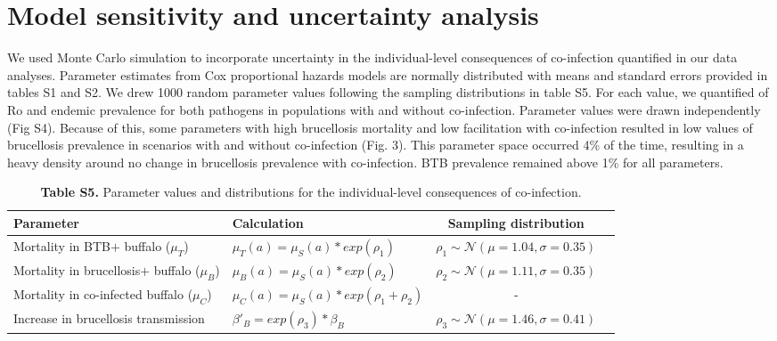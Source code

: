 \documentclass[10pt,letterpaper]{article}
\begin{document}
\section*{Model sensitivity and uncertainty analysis }
We used Monte Carlo simulation to incorporate uncertainty in the individual-level consequences of co-infection quantified in our data analyses. %
Parameter estimates from Cox proportional hazards models are normally distributed with means and standard errors provided in tables S1 and S2. We drew 1000 random parameter values following the sampling distributions in table S5.
For each value, we quantified of Ro and endemic prevalence for both pathogens in populations with and without co-infection.  
Parameter values were drawn independently (Fig S4).
Because of this, some parameters with high brucellosis mortality and low facilitation with co-infection resulted in low values of brucellosis prevalence in scenarios with and without co-infection (Fig. 3).
This parameter space occurred 4\% of the time, resulting in a heavy density around no change in brucellosis prevalence with co-infection. 
BTB prevalence remained above 1\% for all parameters.

\begin{table}[hb]
\caption*{ \textbf{Table S5.} Parameter values and distributions for the individual-level consequences of co-infection.}
\newcommand{\head}[1]{\textnormal{\textbf{#1}}}
\small
\begin{tabular}{llcc} %
\hline
\head{Parameter} & \head{Calculation} & \head{Sampling distribution} \\*
\hline
Mortality in BTB$+$ buffalo ($\mu_T$) & $\mu_T (a) = \mu_S(a) * exp(\rho_1)$ & $\rho_1 \sim \mathcal{N} (\mu = 1.04, \sigma = 0.35)$  \\*
Mortality in brucellosis$+$ buffalo ($\mu_B$)& $\mu_B (a) = \mu_S(a) * exp(\rho_2)$ & $\rho_2 \sim \mathcal{N} (\mu = 1.11, \sigma = 0.35)$ \\*
Mortality in co-infected buffalo ($\mu_C$) & $\mu_C (a) = \mu_S(a) * exp(\rho_1 + \rho_2)$ & - \\* 
Increase in brucellosis transmission & $\beta'_B = exp(\rho_3) * \beta_B$ & $\rho_3 \sim  \mathcal{N} (\mu = 1.46, \sigma = 0.41)$\\* 
\hline 
\end{tabular}
\end{table} 
\end{document}
